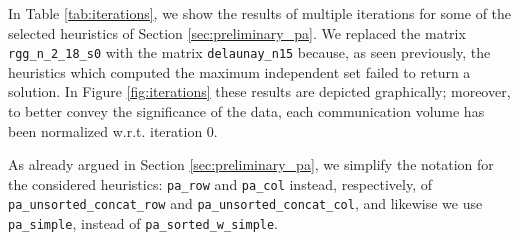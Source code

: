 In Table \ref{tab:iterations}, we show the results of multiple iterations for some of the selected heuristics of Section \ref{sec:preliminary_pa}. We replaced the matrix \verb|rgg_n_2_18_s0| with the matrix \verb|delaunay_n15| because, as seen previously, the heuristics which computed the maximum independent set failed to return a solution. In Figure \ref{fig:iterations} these results are depicted graphically; moreover, to better convey the significance of the data, each communication volume has been normalized w.r.t. iteration 0.

As already argued in Section \ref{sec:preliminary_pa}, we simplify the notation for the considered heuristics: \verb|pa_row| and \verb|pa_col| instead, respectively, of \verb|pa_unsorted_concat_row| and \verb|pa_unsorted_concat_col|, and likewise we use \verb|pa_simple|, instead of \verb|pa_sorted_w_simple|.

\begin{figure}[H]
	\centering
\end{figure}

